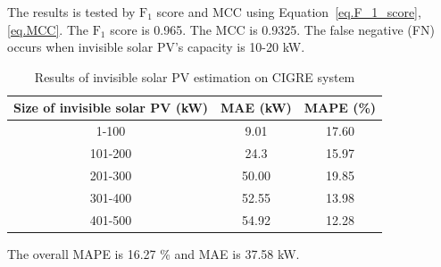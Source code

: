     The results is tested by $\text{F}_{1}$ score and MCC using Equation~\ref{eq.F_1_score}, \ref{eq.MCC}.
    The $\text{F}_{1}$ score is 0.965. The MCC is 0.9325.
    The false negative (FN) occurs when invisible solar PV's capacity is 10-20 kW.

    \begin{table}[H]
      \centering
      \caption{Results of invisible solar PV estimation on CIGRE system}
      \begin{tabular}{ccc}
        \hline
        Size of invisible solar PV (kW) & MAE (kW) & MAPE (\%) \\
        \hline

        1-100                  & 9.01            & 17.60            \\
        101-200                 & 24.3            & 15.97            \\
        201-300                & 50.00            & 19.85            \\
        301-400               & 52.55            & 13.98             \\
        401-500              & 54.92            & 12.28 \\
        \hline

      \end{tabular}
      \label{tab.Error_CIGRE}
    \end{table}

    The overall MAPE is 16.27 \% and MAE is 37.58 kW.
